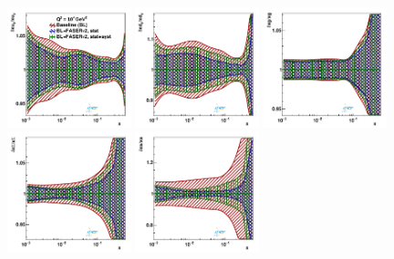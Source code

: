 \begin{figure}[t]
\centering
\includegraphics[width=0.32\textwidth]{plots/proton_fasernu2/inclusive+charm_chargediscrimination/fred05fcorr05_FASERv2_q2_10000_pdf_uv_ratio.pdf}
\includegraphics[width=0.32\textwidth]{plots/proton_fasernu2/inclusive+charm_chargediscrimination/fred05fcorr05_FASERv2_q2_10000_pdf_dv_ratio.pdf}
\includegraphics[width=0.32\textwidth]{plots/proton_fasernu2/inclusive+charm_chargediscrimination/fred05fcorr05_FASERv2_q2_10000_pdf_g_ratio.pdf}\\
\includegraphics[width=0.32\textwidth]{plots/proton_fasernu2/inclusive+charm_chargediscrimination/fred05fcorr05_FASERv2_q2_10000_pdf_Sea_ratio.pdf}
\includegraphics[width=0.32\textwidth]{plots/proton_fasernu2/inclusive+charm_chargediscrimination/fred05fcorr05_FASERv2_q2_10000_pdf_s_ratio.pdf}

\end{figure}
